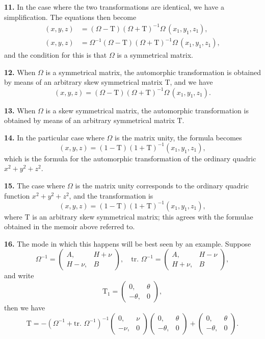 \documentclass[12pt,a4paper]{article}
\theoremstyle{definition}
\begin{document}
\newpage

\medskip
\noindent\textbf{11.} In the case where the two transformations are identical, we have a simplification. The equations then become
\begin{align*}
(x,y,z) &= (\Omega - \mathrm{T})(\Omega + \mathrm{T})^{-1}\Omega\,(x_1,y_1,z_1), \\
(x,y,z) &= \Omega^{-1}(\Omega - \mathrm{T})(\Omega + \mathrm{T})^{-1}\Omega\,(x_1,y_1,z_1),
\end{align*}
and the condition for this is that $\Omega$ is a symmetrical matrix.

\medskip
\noindent\textbf{12.} When $\Omega$ is a symmetrical matrix, the automorphic transformation is obtained by means of an arbitrary skew symmetrical matrix $\mathrm{T}$, and we have
\[
(x,y,z) = (\Omega - \mathrm{T})(\Omega + \mathrm{T})^{-1}\Omega\,(x_1,y_1,z_1).
\]

\medskip
\noindent\textbf{13.} When $\Omega$ is a skew symmetrical matrix, the automorphic transformation is obtained by means of an arbitrary symmetrical matrix $\mathrm{T}$.

\medskip
\noindent\textbf{14.} In the particular case where $\Omega$ is the matrix unity, the formula becomes
\[(x,y,z) = (1 - \mathrm{T})(1 + \mathrm{T})^{-1}(x_1,y_1,z_1),\]
which is the formula for the automorphic transformation of the ordinary quadric $x^2+y^2+z^2$.

\medskip
\noindent\textbf{15.} The case where $\Omega$ is the matrix unity corresponds to the ordinary quadric function $x^2+y^2+z^2$, and the transformation is
\[(x,y,z) = (1 - \mathrm{T})(1 + \mathrm{T})^{-1}(x_1,y_1,z_1),\]
where $\mathrm{T}$ is an arbitrary skew symmetrical matrix; this agrees with the formulae obtained in the memoir above referred to.

\medskip
\noindent\textbf{16.} The mode in which this happens will be best seen by an example. Suppose
\[
\Omega^{-1} = \begin{pmatrix} A, & H+\nu \\ H-\nu, & B \end{pmatrix},\quad
\text{tr. }\Omega^{-1} = \begin{pmatrix} A, & H-\nu \\ H+\nu, & B \end{pmatrix},
\]
and write
\[
\mathrm{T}_1 = \begin{pmatrix} 0, & \theta \\ -\theta, & 0 \end{pmatrix},
\]
then we have
\[
\mathrm{T} = -(\Omega^{-1} + \text{tr. }\Omega^{-1})^{-1}
\begin{pmatrix} 0, & \nu \\ -\nu, & 0 \end{pmatrix}
\begin{pmatrix} 0, & \theta \\ -\theta, & 0 \end{pmatrix}
+ \begin{pmatrix} 0, & \theta \\ -\theta, & 0 \end{pmatrix}.
\]
\end{document}
